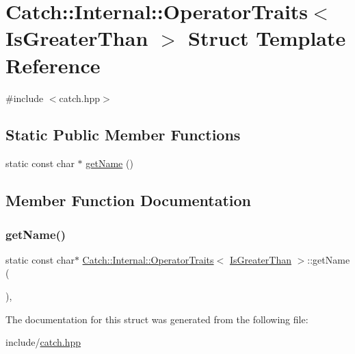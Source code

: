 \hypertarget{struct_catch_1_1_internal_1_1_operator_traits_3_01_is_greater_than_01_4}{}\section{Catch\+:\+:Internal\+:\+:Operator\+Traits$<$ Is\+Greater\+Than $>$ Struct Template Reference}
\label{struct_catch_1_1_internal_1_1_operator_traits_3_01_is_greater_than_01_4}


{\ttfamily \#include $<$catch.\+hpp$>$}

\subsection*{Static Public Member Functions}
\begin{DoxyCompactItemize}
\item 
static const char $\ast$ \mbox{\hyperlink{struct_catch_1_1_internal_1_1_operator_traits_3_01_is_greater_than_01_4_ab917bfb9ccbe461dc684ee5a34d67d27}{get\+Name}} ()
\end{DoxyCompactItemize}


\subsection{Member Function Documentation}
\mbox{\label{struct_catch_1_1_internal_1_1_operator_traits_3_01_is_greater_than_01_4_ab917bfb9ccbe461dc684ee5a34d67d27}} 
\subsubsection{\texorpdfstring{get\+Name()}{getName()}}
{\footnotesize\ttfamily static const char$\ast$ \mbox{\hyperlink{struct_catch_1_1_internal_1_1_operator_traits}{Catch\+::\+Internal\+::\+Operator\+Traits}}$<$ \mbox{\hyperlink{namespace_catch_1_1_internal_ae3f96598a7858155750bf38e7295d83eac0e8866139e99803d169595af70f6c22}{Is\+Greater\+Than}} $>$\+::get\+Name (\begin{DoxyParamCaption}{ }\end{DoxyParamCaption})\hspace{0.3cm}{\ttfamily [inline]}, {\ttfamily [static]}}



The documentation for this struct was generated from the following file\+:\begin{DoxyCompactItemize}
\item 
include/\mbox{\hyperlink{catch_8hpp}{catch.\+hpp}}\end{DoxyCompactItemize}
